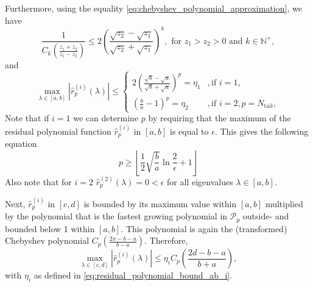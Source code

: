 Furthermore, using the equality \cref{eq:chebyshev_polynomial_approximation}, we have
\begin{equation}
    \frac{1}{C_{k}\left(\frac{z_1 + z_2}{z_1 - z_2}\right)} \leq 2 \left(\frac{\sqrt{z_2} - \sqrt{z_1}}{\sqrt{z_2} + \sqrt{z_1}}\right)^k, \text{ for } z_1 > z_2 > 0 \text{ and } k \in \mathbb{N}^+,
    \label{eq:chebyshev_polynomial_bound}
\end{equation}
and
\begin{equation}
    \max_{\lambda \in [a,b]} |\hat{r}^{(i)}_p(\lambda)| \leq
    \begin{cases}
        2\left(\frac{\sqrt{b}-\sqrt{a}}{\sqrt{b}+\sqrt{a}}\right)^p=\eta_1 & , \text{if } i = 1,                      \\
        \left(\frac{b}{a}-1\right)^p=\eta_2                                & , \text{if } i = 2, p = N_{\text{tail}},
    \end{cases}
    \label{eq:residual_polynomial_bound_ab_i}
\end{equation}
Note that if $i=1$ we can determine $p$ by requiring that the maximum of the residual polynomial function $\hat{r}^{(i)}_p$ in $[a,b]$ is equal to $\epsilon$. This gives the following equation
\begin{equation}
    p \geq \left\lfloor\frac{1}{2}\sqrt{\frac{b}{a}}\ln{\frac{2}{\epsilon}} + 1\right\rfloor
    \label{eq:chebyshev_degree_p}
\end{equation}
Also note that for $i=2$ $\hat{r}^{(2)}_p(\lambda) = 0 < \epsilon$ for all eigenvalues $\lambda \in [a,b]$.

Next, $\hat{r}^{(i)}_p$ in $[c,d]$ is bounded by its maximum value within $[a,b]$ multiplied by the polynomial that is the fastest growing polynomial in $\mathcal{P}_{p}$ outside- and bounded below 1 within $[a,b]$. This polynomial is again the (transformed) Chebyshev polynomial $C_{p}\left(\frac{2x - b - a}{b - a}\right)$. Therefore,
\begin{equation*}
    \max_{\lambda \in [c,d]} |\hat{r}^{(i)}_p(\lambda)| \leq \eta_i C_{p}\left(\frac{2d - b - a}{b + a}\right),
\end{equation*}
with $\eta_i$ as defined in \cref{eq:residual_polynomial_bound_ab_i}.

